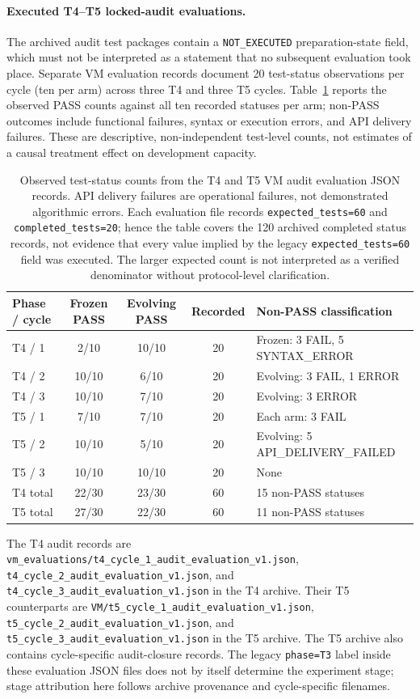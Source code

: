 \documentclass[11pt,a4paper]{article}
\begin{document}
\paragraph{Executed T4--T5 locked-audit evaluations.}
The archived audit test packages contain a \texttt{NOT\_EXECUTED} preparation-state field, which must not be interpreted as a statement that no subsequent evaluation took place. Separate VM evaluation records document 20 test-status observations per cycle (ten per arm) across three T4 and three T5 cycles. Table~\ref{tab:t4t5-audit} reports the observed PASS counts against all ten recorded statuses per arm; non-PASS outcomes include functional failures, syntax or execution errors, and API delivery failures. These are descriptive, non-independent test-level counts, not estimates of a causal treatment effect on development capacity.
\begin{table}[htbp]
\centering\small
\begin{tabular}{lcccl}
\hline
Phase / cycle & Frozen PASS & Evolving PASS & Recorded & Non-PASS classification \\
\hline
T4 / 1 & 2/10 & 10/10 & 20 & Frozen: 3 FAIL, 5 SYNTAX\_ERROR \\
T4 / 2 & 10/10 & 6/10 & 20 & Evolving: 3 FAIL, 1 ERROR \\
T4 / 3 & 10/10 & 7/10 & 20 & Evolving: 3 ERROR \\
T5 / 1 & 7/10 & 7/10 & 20 & Each arm: 3 FAIL \\
T5 / 2 & 10/10 & 5/10 & 20 & Evolving: 5 API\_DELIVERY\_FAILED \\
T5 / 3 & 10/10 & 10/10 & 20 & None \\
\hline
T4 total & 22/30 & 23/30 & 60 & 15 non-PASS statuses \\
T5 total & 27/30 & 22/30 & 60 & 11 non-PASS statuses \\
\hline
\end{tabular}
\caption{Observed test-status counts from the T4 and T5 VM audit evaluation JSON records. API delivery failures are operational failures, not demonstrated algorithmic errors. Each evaluation file records \texttt{expected\_tests=60} and \texttt{completed\_tests=20}; hence the table covers the 120 archived completed status records, not evidence that every value implied by the legacy \texttt{expected\_tests=60} field was executed. The larger expected count is not interpreted as a verified denominator without protocol-level clarification.}\label{tab:t4t5-audit}
\end{table}
The T4 audit records are \texttt{vm\_evaluations/t4\_cycle\_1\_audit\_evaluation\_v1.json}, \texttt{t4\_cycle\_2\_audit\_evaluation\_v1.json}, and \texttt{t4\_cycle\_3\_audit\_evaluation\_v1.json} in the T4 archive. Their T5 counterparts are \texttt{VM/t5\_cycle\_1\_audit\_evaluation\_v1.json}, \texttt{t5\_cycle\_2\_audit\_evaluation\_v1.json}, and \texttt{t5\_cycle\_3\_audit\_evaluation\_v1.json} in the T5 archive. The T5 archive also contains cycle-specific audit-closure records. The legacy \texttt{phase=T3} label inside these evaluation JSON files does not by itself determine the experiment stage; stage attribution here follows archive provenance and cycle-specific filenames.
\end{document}
